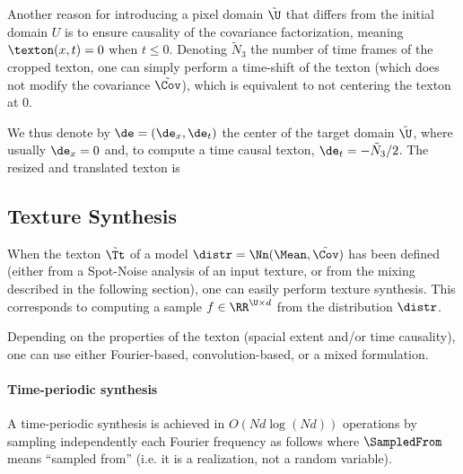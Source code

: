 
Another reason for introducing a pixel domain $\tilde \U$ that differs from the initial domain $U$ is to ensure causality of the covariance factorization, meaning $\texton(x,t)=0$ when $t \leq 0$. Denoting $\tilde N_3$ the number of time frames of the cropped texton, one can simply perform a time-shift of the texton (which does not modify the covariance $\tilde\Cov$), which is equivalent to not centering the texton at 0.

We thus denote by $\de = (\de_x,\de_t)$ the center of the target domain $\tilde \U$, where usually $\de_x=0$ and, to compute a time causal texton, $\de_t=-\tilde N_3/2$. The resized and translated texton is



\subsection{Texture Synthesis}

When the texton $\tilde\Tt$ of a model $\distr=\Nn(\Mean,\tilde\Cov)$ has been defined (either from a Spot-Noise analysis of an input texture, or from the mixing described in the following section), one can easily perform texture synthesis. This corresponds to computing a sample $f \in \RR^{\U \times d}$ from the distribution $\distr$.

Depending on the properties of the texton (spacial extent and/or time causality), one can use either Fourier-based, convolution-based, or a mixed formulation. 

\paragraph{Time-periodic synthesis}

A time-periodic synthesis is achieved in $O(Nd\log(Nd))$ operations by sampling independently each Fourier frequency as follows
where $\SampledFrom$ means ``sampled from'' (i.e. it is a realization, not a random variable).

